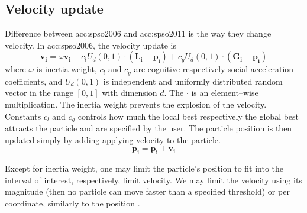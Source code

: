 \subsection{Velocity update}

Difference between \acrshort{acc:spso2006} and \acrshort{acc:spso2011} is the way they change velocity. In \acrshort{acc:spso2006}, the velocity update is
$$
\mathbf{v_i} = \omega\mathbf{v_i} 
+ c_l U_d\left( 0,1 \right) \cdot \left( \mathbf{L_i} - \mathbf{p_i} \right)
+ c_g U_d\left( 0,1 \right) \cdot \left( \mathbf{G_i} - \mathbf{p_i} \right)
$$ 
where $\omega$ is inertia weight, $c_l$ and $c_g$ are cognitive respectively social acceleration coefficients, and $U_d(0,1)$ is independent and uniformly distributed random vector in the range $\left[ 0,1 \right]$ with dimension $d$. The $\cdot$ is an element--wise multiplication. The inertia weight prevents the explosion of the velocity. Constants $c_l$ and $c_g$ controls how much the local best respectively the global best attracts the particle and are specified by the user. The particle position is then updated simply by adding applying velocity to the particle.
$$
\mathbf{p_i} = \mathbf{p_i} + \mathbf{v_i}
$$

Except for inertia weight, one may limit the particle's position to fit into the interval of interest, respectively, limit velocity. We may limit the velocity using its magnitude (then no particle can move faster than a specified threshold) or per coordinate, similarly to the position \citep{PSOvelocitylimit}.

